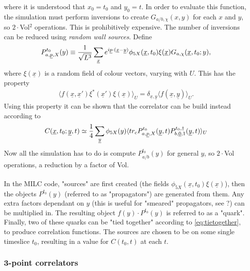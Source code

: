 \documentclass[a4paper,10pt]{article}
\numberwithin{equation}{section}
\begin{document}
where it is understood that $x_0=t_0$ and $y_0=t$. In order to evaluate this function, the simulation must perform inversions to create $G_{a/b,\chi}(x,y)$ for each $x$ and $y$, so $2\cdot$Vol$^2$ operations. This is prohibitively expensive. The number of inversions can be reduced using {\it{random wall sources}}. Define
\begin{align}
	P^{t_0}_{a,\underline{p},X}(y) \equiv {1\over \sqrt{L^3}} \sum_{\underline{x}} e^{i\underline{p}\cdot (\underline{x}-\underline{y})} \phi_{5X}(\underline{x},t_0) \xi(\underline{x}) G_{a,\chi}(\underline{x},t_0;y),
\end{align} 
where $\xi(\underline{x})$ is a random field of colour vectors, varying with $U$. This has the property
\begin{align}
	\langle f(\underline{x},\underline{x}') \xi^*(\underline{x}')\xi(\underline{x})\rangle_U = \delta_{\underline{x},\underline{y}} \langle f(\underline{x},\underline{y}) \rangle_U.
\end{align}
Using this property it can be shown that the correlator can be build instead according to
\begin{align}
	C(\underline{x},t_0;\underline{y},t) \simeq {1\over 4} \sum_{\underline{y}} \phi_{5X}(y) \langle tr_c P^{t_0}_{a,\underline{p},X}(\underline{y},t)P^{t_0,\dagger}_{b,\underline{0},1}(\underline{y},t)\rangle_U
	\label{eq:tietogether}
\end{align}
Now all the simulation has to do is compute $P^{t_0}_{a/b}(y)$ for general $y$, so $2\cdot$Vol operations, a reduction by a factor of Vol. 
\\ \\
In the MILC code, "sources" are first created (the fields $\phi_{5X}(\underline{x},t_0) \xi(\underline{x})$), then the objects $P^{t_0}(y)$ (referred to as "propagators") are generated from them. Any extra factors dependant on $y$ (this is useful for "smeared" propagators, see {\color{red}?}) can be multiplied in. The resulting object $f(y)\cdot P^{t_0}(y)$ is referred to as a "quark". Finally, two of these quarks can be "tied together" according to \eqref{eq:tietogether}, to produce correlation functions. The sources are chosen to be on some single timeslice $t_0$, resulting in a value for $C(t_0,t)$ at each $t$. 

\subsubsection{3-point correlators}
\end{document}
